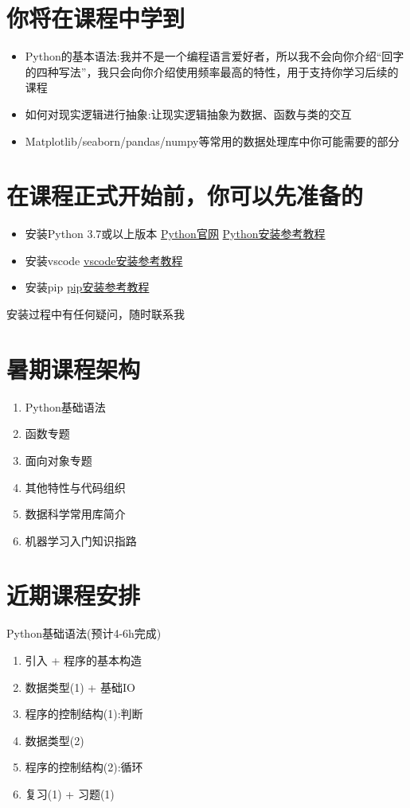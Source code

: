 \documentclass[utf8, 12pt, a4paper, oneside]{ctexart}
\begin{document}
\newpage


\section{你将在课程中学到}
\begin{itemize}
    \item Python的基本语法:我并不是一个编程语言爱好者，所以我不会向你介绍“回字的四种写法”，我只会向你介绍使用频率最高的特性，用于支持你学习后续的课程
    \item 如何对现实逻辑进行抽象:让现实逻辑抽象为数据、函数与类的交互
    \item Matplotlib/seaborn/pandas/numpy等常用的数据处理库中你可能需要的部分
\end{itemize}

\newpage


\section{在课程正式开始前，你可以先准备的}
\begin{itemize}
    \item 安装Python 3.7或以上版本 \href{https://www.python.org/}{Python官网} \href{https://zhuanlan.zhihu.com/p/439514720}{Python安装参考教程}
    \item 安装vscode \href{https://zhuanlan.zhihu.com/p/364910894}{vscode安装参考教程}
    \item 安装pip  \href{https://zhuanlan.zhihu.com/p/38603105}{pip安装参考教程}
\end{itemize}
安装过程中有任何疑问，随时联系我

\newpage


\section{暑期课程架构}
\begin{enumerate}
    \item Python基础语法
    \item 函数专题
    \item 面向对象专题
    \item 其他特性与代码组织
    \item 数据科学常用库简介
    \item 机器学习入门知识指路    
\end{enumerate}

\newpage


\section{近期课程安排}
Python基础语法(预计4-6h完成)
\begin{enumerate}
    \item 引入 + 程序的基本构造
    \item 数据类型(1) + 基础IO
    \item 程序的控制结构(1):判断
    \item 数据类型(2)
    \item 程序的控制结构(2):循环
    \item 复习(1) + 习题(1)
\end{enumerate}
\end{document}
